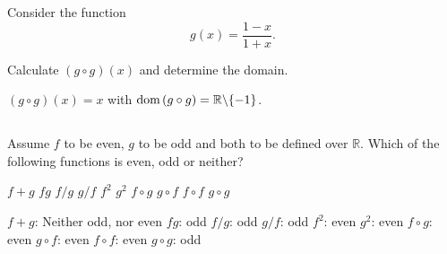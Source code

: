 \ifanalysis\begin{Exercise}[difficulty = 1]\fi \ifcalculus\begin{Exercise}[difficulty = 2]\fi 
Consider the function 
	$$g(x)= \dfrac{1-x}{1+x}.$$

Calculate $(g\circ g) (x)$ and determine the domain. 
\ifanalysis\end{Exercise}\fi \ifcalculus\end{Exercise}\fi

\begin{Answer}\phantom{}
    $(g\circ g) (x) = x$ \; with $\text{dom}{\,} (g\circ g) = \mathbb{R}\backslash\{ -1 \}$.
\end{Answer}


\ifanalysis\subsection*{}\fi

\ifanalysis
	\begin{Exercise} Assume $f$ to be even, $g$ to be odd and both to be defined over $\mathbb{R}$. Which of the following functions is even, odd or neither?
	\begin{multicols}{3}
		\Question[difficulty = 1] $f + g$ 
		\Question[difficulty = 1] $fg$ 
		\Question[difficulty = 1] $f/g$
		\Question[difficulty = 1] $g/f$
		\Question[difficulty = 1] $f^2$
		\Question[difficulty = 1] $g^2$
		\Question[difficulty = 1] $f \circ g$
		\Question[difficulty = 1] $g \circ f$
		\Question[difficulty = 1] $f \circ f$
		\Question[difficulty = 1] $g \circ g$
		\EndCurrentQuestion
	\end{multicols}
\end{Exercise}

	\begin{Answer}\phantom{}
	    \begin{multicols}{2}
		
    		\Question $f + g$: Neither odd, nor even  
    		\Question $fg$: odd 
    		\Question $f/g$: odd 
    		\Question $g/f$: odd 
    		\Question $f^2$: even
    		\Question $g^2$: even
    		\Question $f \circ g$: even
    		\Question $g \circ f$: even
    		\Question $f \circ f$: even
    		\Question $g \circ g$: odd 
	    \EndCurrentQuestion 
	    \end{multicols}
	\end{Answer}
\fi


